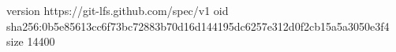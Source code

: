 version https://git-lfs.github.com/spec/v1
oid sha256:0b5e85613cc6f73bc72883b70d16d144195dc6257e312d0f2cb15a5a3050e3f4
size 14400
